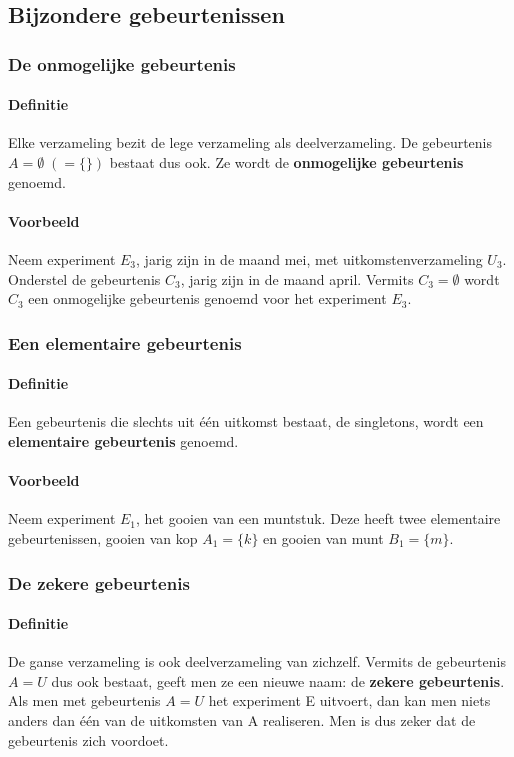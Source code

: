 \documentclass[12pt,twoside]{article}
\begin{document}
\subsection{Bijzondere gebeurtenissen}

\subsubsection{De onmogelijke gebeurtenis}

\paragraph*{Definitie} Elke verzameling bezit de lege verzameling als deelverzameling. De gebeurtenis $A = \emptyset \;(=\{\})$ bestaat dus ook. Ze wordt de {\bf onmogelijke gebeurtenis} genoemd.

\paragraph*{Voorbeeld}
Neem experiment $E_3$, jarig zijn in de maand mei, met uitkomstenverzameling $U_3$. Onderstel de gebeurtenis $C_3$, jarig zijn in de maand april. Vermits $C_3=\emptyset$ wordt $C_3$ een onmogelijke gebeurtenis genoemd voor het experiment $E_3$.

\subsubsection{Een elementaire gebeurtenis}

\paragraph*{Definitie} Een gebeurtenis die slechts uit één uitkomst bestaat, de singletons, wordt een {\bf elementaire gebeurtenis} genoemd.

\paragraph*{Voorbeeld}
Neem experiment $E_1$, het gooien van een muntstuk. Deze heeft twee elementaire gebeurtenissen, gooien van kop $A_1=\{k\}$ en gooien van munt $B_1=\{m\}$.

\subsubsection{De zekere gebeurtenis}

\paragraph*{Definitie }De ganse verzameling is ook deelverzameling van zichzelf. Vermits de gebeurtenis $A= U$ dus ook bestaat, geeft men ze een nieuwe naam: de {\bf zekere gebeurtenis}. Als men met gebeurtenis $A = U$ het experiment E uitvoert, dan kan men niets anders dan één van de uitkomsten van A realiseren. Men is dus zeker dat de gebeurtenis zich voordoet.
\end{document}
